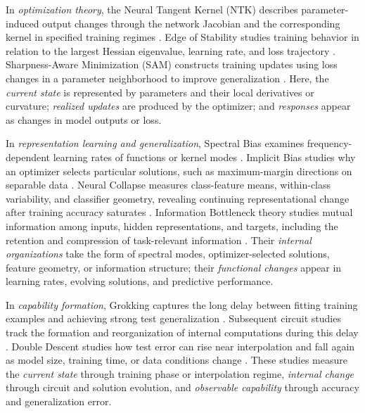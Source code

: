 \documentclass[conference,10pt]{IEEEtran}
\begin{document}
In \emph{optimization theory}, the Neural Tangent Kernel (NTK) describes parameter-induced output changes through the network Jacobian and the corresponding kernel in specified training regimes \cite{jacot2018}. Edge of Stability studies training behavior in relation to the largest Hessian eigenvalue, learning rate, and loss trajectory \cite{cohen2021}. Sharpness-Aware Minimization (SAM) constructs training updates using loss changes in a parameter neighborhood to improve generalization \cite{foret2021}. Here, the \emph{current state} is represented by parameters and their local derivatives or curvature; \emph{realized updates} are produced by the optimizer; and \emph{responses} appear as changes in model outputs or loss.

In \emph{representation learning and generalization}, Spectral Bias examines frequency-dependent learning rates of functions or kernel modes \cite{rahaman2019}. Implicit Bias studies why an optimizer selects particular solutions, such as maximum-margin directions on separable data \cite{soudry2018}. Neural Collapse measures class-feature means, within-class variability, and classifier geometry, revealing continuing representational change after training accuracy saturates \cite{papyan2020}. Information Bottleneck theory studies mutual information among inputs, hidden representations, and targets, including the retention and compression of task-relevant information \cite{tishby2015}. Their \emph{internal organizations} take the form of spectral modes, optimizer-selected solutions, feature geometry, or information structure; their \emph{functional changes} appear in learning rates, evolving solutions, and predictive performance.

In \emph{capability formation}, Grokking captures the long delay between fitting training examples and achieving strong test generalization \cite{power2022}. Subsequent circuit studies track the formation and reorganization of internal computations during this delay \cite{nanda2023}. Double Descent studies how test error can rise near interpolation and fall again as model size, training time, or data conditions change \cite{belkin2019,nakkiran2020}. These studies measure the \emph{current state} through training phase or interpolation regime, \emph{internal change} through circuit and solution evolution, and \emph{observable capability} through accuracy and generalization error.
\end{document}
